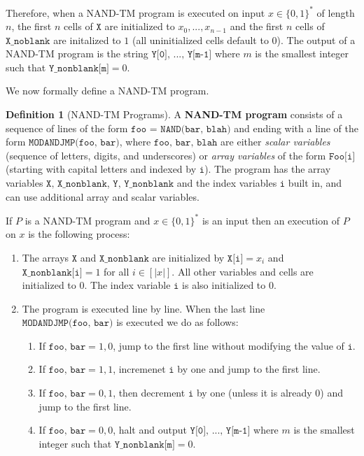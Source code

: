 \documentclass[a4paper, 12pt]{report}
\theoremstyle{remark}
\theoremstyle{definition}
\newtheorem{definition}{Definition}[section]
\begin{document}
\begin{enumerate}
\end{enumerate}
Therefore, when a NAND-TM program is executed on input $x \in \{0,1\}^*$ of length $n$, the first $n$ cells of $\texttt{X}$ are initialized to $x_0, ..., x_{n-1}$ and the first $n$ cells of $\texttt{X\_noblank}$ are initalized to $1$ (all uninitialized cells default to $0$). The output of a NAND-TM program is the string $\texttt{Y[0], ..., Y[m-1]}$ where $m$ is the smallest integer such that $\texttt{Y\_nonblank[m]} = 0$. 

We now formally define a NAND-TM program. 

\begin{definition}[NAND-TM Programs]
A \textbf{NAND-TM program} consists of a sequence of lines of the form $\texttt{foo = NAND(bar, blah)}$ and ending with a line of the form $\texttt{MODANDJMP(foo, bar)}$, where $\texttt{foo, bar, blah}$ are either \textit{scalar variables} (sequence of letters, digits, and underscores) or \textit{array variables} of the form $\texttt{Foo[i]}$ (starting with capital letters and indexed by $\texttt{i}$). The program has the array variables $\texttt{X, X\_nonblank}$, $\texttt{Y, Y\_nonblank}$ and the index variables $\texttt{i}$ built in, and can use additional array and scalar variables. 

If $P$ is a NAND-TM program and $x \in \{0,1\}^*$ is an input then an execution of $P$ on $x$ is the following process: 
\begin{enumerate}
    \item The arrays $\texttt{X}$ and $\texttt{X\_nonblank}$ are initialized by $\texttt{X[i]} = x_i$ and $\texttt{X\_nonblank[i]} = 1$ for all $i \in [|x|]$. All other variables and cells are initialized to $0$. The index variable $\texttt{i}$ is also initialized to $0$. 
    \item The program is executed line by line. When the last line $\texttt{MODANDJMP(foo, bar)}$ is executed we do as follows: 
    \begin{enumerate}
        \item If $\texttt{foo, bar} = 1, 0$, jump to the first line without modifying the value of $\texttt{i}$. 
        \item If $\texttt{foo, bar} = 1, 1$, incremenet $\texttt{i}$ by one and jump to the first line. 
        \item If $\texttt{foo, bar} = 0, 1 $, then decrement $\texttt{i}$ by one (unless it is already 0) and jump to the first line. 
        \item If $\texttt{foo, bar} = 0, 0$, halt and output $\texttt{Y[0], ..., Y[m-1]}$ where $m$ is the smallest integer such that $\texttt{Y\_nonblank[m]} = 0$. 
    \end{enumerate}
\end{enumerate}
\end{definition}
\end{document}
